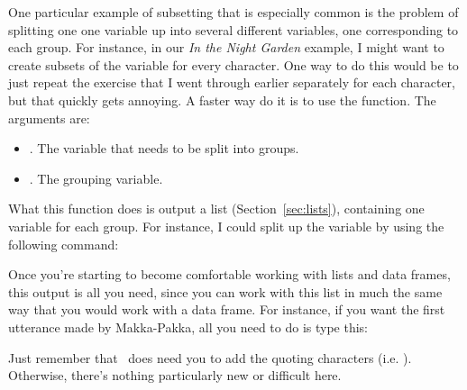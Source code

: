 
One particular example of subsetting that is especially common is the problem of splitting one one variable up into several different variables, one corresponding to each group. For instance, in our {\it In the Night Garden} example, I might want to create subsets of the  variable for every character. One way to do this would be to just repeat the exercise that I went through earlier separately for each character, but that quickly gets annoying. A faster way do it is to use the  function. The arguments are:
\begin{itemize} \itemsep 0pt
\item {}. The variable that needs to be split into groups.
\item {}. The grouping variable.
\end{itemize}
What this function does is output a list (Section~\ref{sec:lists}), containing one variable for each group. For instance, I could split up the  variable by  using the following command:
Once you're starting to become comfortable working with lists and data frames, this output is all you need, since you can work with this list in much the same way that you would work with a data frame. For instance, if you want the first utterance made by Makka-Pakka, all you need to do is type this:
Just remember that \R\ does need you to add the quoting characters (i.e. ). Otherwise, there's nothing particularly new or difficult here. 

